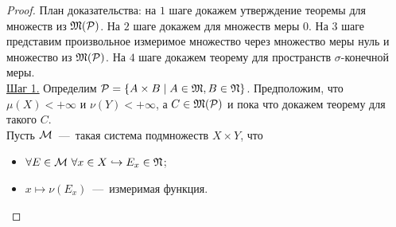 \begin{proof}
    План доказательства: на $1$ шаге докажем утверждение теоремы для множеств из $\mathfrak{M}(\mathcal{P})$. На $2$ шаге докажем для множеств меры $0$. На $3$ шаге представим произвольное измеримое множество через множество меры нуль и множество из $\mathfrak{M}(\mathcal{P})$. На $4$ шаге докажем теорему для пространств $\sigma$-конечной меры.\\
    \underline{Шаг 1.} Определим $\mathcal{P} = \{A \times B \mid A \in \mathfrak{M}, B \in \mathfrak{N} \}$. Предположим, что $\mu(X) < +\infty$ и $\nu(Y) < +\infty$, а $C \in \mathfrak{M}(\mathcal{P})$ и пока что докажем теорему для такого $C$.\\
    Пусть $\mathcal{M}$~---~такая система подмножеств $X \times Y$, что \begin{itemize}
        \item $\forall E \in \mathcal{M} \  \forall x \in X \hookrightarrow E_x \in \mathfrak{N}$;
        \item $x \mapsto \nu(E_x)$~---~измеримая функция.
    \end{itemize}


\end{proof}
